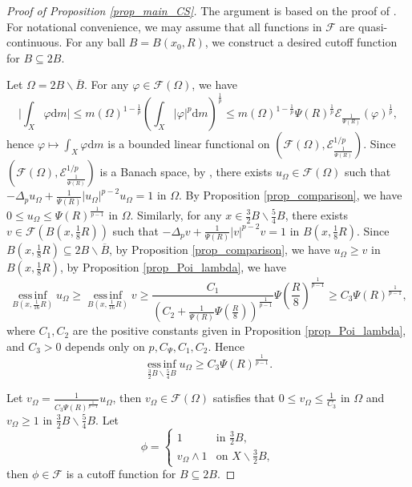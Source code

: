 \documentclass[11pt,a4paper]{article}
\numberwithin{equation}{section}
\newcommand{\einf}{\operatorname*{ess\,inf}}
\theoremstyle{plain}
\theoremstyle{definition}
\begin{document}
\begin{proof}[Proof of Proposition \ref{prop_main_CS}]
The argument is based on the proof of \cite[THEOREM 3.2]{GHL15}. For notational convenience, we may assume that all functions in $\mathcal{F}$ are quasi-continuous. For any ball $B=B(x_0,R)$, we construct a desired cutoff function for $B\subseteq 2B$.

Let $\Omega=2B\backslash\overline{B}$. For any $\varphi\in\mathcal{F}(\Omega)$, we have
$$\lvert\int_X\varphi\mathrm{d} m\rvert\le m(\Omega)^{1-\frac{1}{p}}\left(\int_X|\varphi|^p\mathrm{d} m\right)^{\frac{1}{p}}\le m(\Omega)^{1-\frac{1}{p}}\Psi(R)^{\frac{1}{p}}\mathcal{E}_{\frac{1}{\Psi(R)}}(\varphi)^{\frac{1}{p}},$$
hence $\varphi\mapsto\int_X\varphi\mathrm{d} m$ is a bounded linear functional on $(\mathcal{F}(\Omega),\mathcal{E}_{\frac{1}{\Psi(R)}}^{1/p})$. Since $(\mathcal{F}(\Omega),\mathcal{E}_{\frac{1}{\Psi(R)}}^{1/p})$ is a Banach space, by \cite[Corollary 3.25]{KS24a}, there exists $u_\Omega\in\mathcal{F}(\Omega)$ such that $-\Delta_p u_\Omega+\frac{1}{\Psi(R)}|u_\Omega|^{p-2}u_\Omega=1$ in $\Omega$. By Proposition \ref{prop_comparison}, we have $0\le u_\Omega\le {\Psi(R)^{\frac{1}{p-1}}}$ in $\Omega$. Similarly, for any $x\in \frac{3}{2}B\backslash \frac{5}{4}B$, there exists $v\in\mathcal{F}(B(x,\frac{1}{8}R))$ such that $-\Delta_p v+\frac{1}{\Psi(R)}|v|^{p-2}v=1$ in $B(x,\frac{1}{8}R)$. Since $B(x,\frac{1}{8}R)\subseteq 2B\backslash\overline{B}$, by Proposition \ref{prop_comparison}, we have $u_\Omega\ge v$ in $B(x,\frac{1}{8}R)$, by Proposition \ref{prop_Poi_lambda}, we have
$$\einf_{B(x,\frac{1}{16}R)}u_\Omega\ge \einf_{B(x,\frac{1}{16}R)}v\ge \frac{C_1}{\left(C_2+\frac{1}{\Psi(R)}\Psi\left(\frac{R}{8}\right)\right)^{\frac{1}{p-1}}}\Psi\left(\frac{R}{8}\right)^{\frac{1}{p-1}}\ge C_3 \Psi(R)^{\frac{1}{p-1}},$$
where $C_1,C_2$ are the positive constants given in Proposition \ref{prop_Poi_lambda}, and $C_3>0$ depends only on $p,C_\Psi,C_1,C_2$. Hence
$$\einf_{\frac{3}{2}B\backslash \frac{5}{4}B}u_\Omega\ge C_3 \Psi(R)^{\frac{1}{p-1}}.$$

Let $v_\Omega=\frac{1}{C_3 \Psi(R)^{\frac{1}{p-1}}}u_\Omega$, then $v_\Omega\in\mathcal{F}(\Omega)$ satisfies that $0\le v_\Omega\le \frac{1}{C_3}$ in $\Omega$ and $v_\Omega\ge1$ in $\frac{3}{2}B\backslash \frac{5}{4}B$. Let
$$\phi=
\begin{cases}
1&\text{in }\frac{3}{2}B,\\
v_\Omega\wedge1&\text{on }X\backslash \frac{3}{2}B,
\end{cases}
$$
then $\phi\in\mathcal{F}$ is a cutoff function for $B\subseteq 2B$.


\end{proof}
\end{document}
